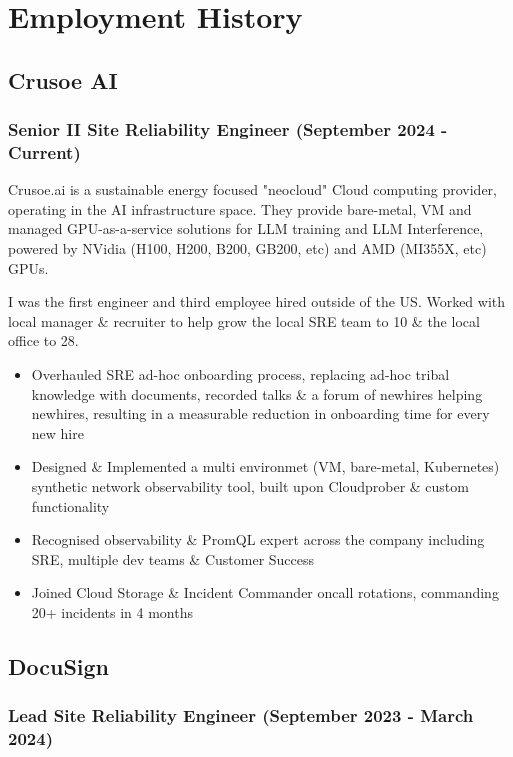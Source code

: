 \documentclass[a4paper, 10pt] {article}
\begin{document}
\newpage

\section*{Employment History}

\subsection*{Crusoe AI}

\subsubsection*{Senior II Site Reliability Engineer (September 2024 - Current)}

Crusoe.ai is a sustainable energy focused "neocloud" Cloud computing provider, operating in the AI infrastructure space. They provide bare-metal,
VM and managed GPU-as-a-service solutions for LLM training and LLM Interference, powered by NVidia (H100, H200, B200, GB200, etc)
and AMD (MI355X, etc) GPUs.

I was the first engineer and third employee hired outside of the US. Worked with local manager \& recruiter to help grow the local SRE team to 10
\& the local office to 28.

\begin{itemize}[noitemsep]
	\item Overhauled SRE ad-hoc onboarding process, replacing ad-hoc tribal knowledge with documents, recorded talks \& a forum of newhires helping newhires, resulting in a measurable reduction in onboarding time for every new hire
 	\item Designed \& Implemented a multi environmet (VM, bare-metal, Kubernetes) synthetic network observability tool, built upon Cloudprober \& custom functionality
    \item Recognised observability \& PromQL expert across the company including SRE, multiple dev teams \& Customer Success
 	\item Joined Cloud Storage \& Incident Commander oncall rotations, commanding 20+ incidents in 4 months
\end{itemize}

\subsection*{DocuSign}

\subsubsection*{Lead Site Reliability Engineer (September 2023 - March 2024)}
\end{document}
